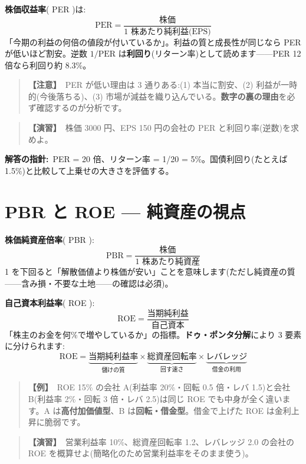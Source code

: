 \documentclass{article}
\begin{document}
\textbf{株価収益率}( PER )は:
\[ \mathrm{PER} = \frac{\text{株価}}{\text{1 株あたり純利益(EPS)}} \]
「今期の利益の何倍の値段が付いているか」。利益の質と成長性が同じなら PER が低いほど割安。逆数 \(1/\mathrm{PER}\) は\textbf{利回り}(リターン率)として読めます——PER 12 倍なら利回り約 8.3\%。

\begin{quote}
\textbf{【注意】}\ PER が低い理由は 3 通りある:(1) 本当に割安、(2) 利益が一時的(今後落ちる)、(3) 市場が減益を織り込んでいる。\textbf{数字の裏の理由}を必ず確認するのが分析です。
\end{quote}

\begin{quote}
\textbf{【演習】}\ 株価 3000 円、EPS 150 円の会社の PER と利回り率(逆数)を求めよ。
\end{quote}

\textbf{解答の指針:}\ PER = 20 倍、リターン率 = 1/20 = 5\%。国債利回り(たとえば 1.5\%)と比較して上乗せの大きさを評価する。

\section{PBR と ROE — 純資産の視点}

\textbf{株価純資産倍率}( PBR ):
\[ \mathrm{PBR} = \frac{\text{株価}}{\text{1 株あたり純資産}} \]
1 を下回ると「解散価値より株価が安い」ことを意味します(ただし純資産の質——含み損・不要な土地——の確認は必須)。

\textbf{自己資本利益率}( ROE ):
\[ \mathrm{ROE} = \frac{\text{当期純利益}}{\text{自己資本}} \]
「株主のお金を何\%で増やしているか」の指標。\textbf{ドゥ・ポンタ分解}により 3 要素に分けられます:
\[ \mathrm{ROE} = \underbrace{\text{当期純利益率}}_{\text{儲けの質}} \times \underbrace{\text{総資産回転率}}_{\text{回す速さ}} \times \underbrace{\text{レバレッジ}}_{\text{借金の利用}} \]

\begin{quote}
\textbf{【例】}\ ROE 15\% の会社 A(利益率 20\%・回転 0.5 倍・レバ 1.5)と会社 B(利益率 2\%・回転 3 倍・レバ 2.5)は同じ ROE でも中身が全く違います。A は\textbf{高付加価値型}、B は\textbf{回転・借金型}。借金で上げた ROE は金利上昇に脆弱です。
\end{quote}

\begin{quote}
\textbf{【演習】}\ 営業利益率 10\%、総資産回転率 1.2、レバレッジ 2.0 の会社の ROE を概算せよ(簡略化のため営業利益率をそのまま使う)。
\end{quote}
\end{document}
